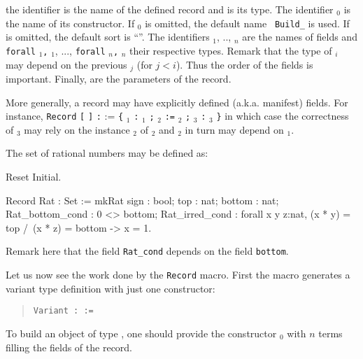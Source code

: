 \noindent the identifier {\ident} is the name of the defined record
and {\sort} is its type. The identifier {\ident$_0$} is the name of
its constructor. If {\ident$_0$} is omitted, the default name {\tt
Build\_{\ident}} is used. If {\sort} is omitted, the default sort is ``{\Type}''.
The identifiers {\ident$_1$}, ..,
{\ident$_n$} are the names of fields and {\tt forall} \binders$_1${\tt ,} {\term$_1$}, ..., {\tt forall} \binders$_n${\tt ,} {\term$_n$}
their respective types. Remark that the type of {\ident$_i$} may
depend on the previous {\ident$_j$} (for $j<i$). Thus the order of the
fields is important. Finally, {\params} are the parameters of the
record.

More generally, a record may have explicitly defined (a.k.a.
manifest) fields. For instance, {\tt Record} {\ident} {\tt [}
{\params} {\tt ]} \texttt{:} {\sort} := \verb+{+ {\ident$_1$}
\texttt{:} {\type$_1$} \verb+;+ {\ident$_2$} \texttt{:=} {\term$_2$}
\verb+;+ {\ident$_3$} \texttt{:} {\type$_3$} \verb+}+ in which case
the correctness of {\type$_3$} may rely on the instance {\term$_2$} of
{\ident$_2$} and {\term$_2$} in turn may depend on {\ident$_1$}.


\Example
The set of rational numbers may be defined as:
\begin{coq_eval}
Reset Initial.
\end{coq_eval}
\begin{coq_example}
Record Rat : Set := mkRat
  {sign : bool;
   top : nat;
   bottom : nat;
   Rat_bottom_cond : 0 <> bottom;
   Rat_irred_cond :
    forall x y z:nat, (x * y) = top /\ (x * z) = bottom -> x = 1}.
\end{coq_example}

Remark here that the field
\verb+Rat_cond+ depends on the field \verb+bottom+. 

%

Let us now see the work done by the {\tt Record} macro.  First the
macro generates a variant type definition with just one constructor:
\begin{quote}
{\tt Variant {\ident} {\params} :{\sort} :=} \\
\end{quote}
To build an object of type {\ident}, one should provide the
constructor {\ident$_0$} with $n$ terms filling the fields of
the record.

